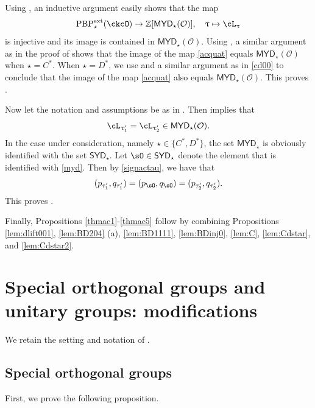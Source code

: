 \documentclass[11pt,a4paper]{amsart}
\def\SYD{{\mathsf{SYD}}}
\def\MYD{{\mathsf{MYD}}}
\newcommand{\CO}{{\mathcal {O}}}
\newcommand{\Z}{\mathbb{Z}}
\newcommand{\be}{\begin {equation}}
\newcommand{\ee}{\end {equation}}
\numberwithin{equation}{section}
\theoremstyle{remark}
\def\PBPes{\mathrm{PBP}^{\mathrm{ext}}_{\star}}
\def\SYD{{\mathsf{SYD}}}
\def\MYD{{\mathsf{MYD}}}
\def\ac{\cL}
\begin{document}
Using , an inductive argument  easily shows that the map
\be\label{acquat}
    \PBPes(\ckcO)\rightarrow \Z[\MYD_\star(\CO)],\quad \uptau\mapsto \ac_\uptau
    \ee
    is injective and its image is contained in  $\MYD_\star(\CO)$.
    Using , a similar argument as in the proof of  shows that the image of the map \eqref{acquat} equals $\MYD_\star(\CO)$ when $\star=C^*$. When $\star=D^*$, we use  and a similar argument as in \eqref{cd00} to conclude that the image of the map \eqref{acquat} also equals $\MYD_\star(\CO)$. This proves . 
    
Now let the notation and assumptions be as in . 
Then  implies that 
\be\label{myd}
\ac_{\uptau_1'}=\ac_{\uptau_2'}\in \MYD_\star(\CO).
\ee
In the case under consideration, namely $\star\in \{C^*, D^*\}$, the set $\MYD_\star$ is obviously identified with the set $\SYD_\star$. Let $\sO\in \SYD_\star$ denote the element that is identified with \eqref{myd}. Then by \eqref{signactau}, we have that
\[
( p_{\tau'_1}, q_{\tau'_1})=(p_\sO, q_\sO)=( p_{\tau'_2}, q_{\tau'_2}).
\]
 This proves .
 
 
 Finally, Propositions \ref{thmac1}-\ref{thmac5} follow by combining Propositions \ref{lem:dlift001}, \ref{lem:BD204} (a), \ref{lem:BD1111}, \ref{lem:BDinj0}, \ref{lem:C},  \ref{lem:Cdstar}, and \ref{lem:Cdstar2}.


\section{Special orthogonal groups and unitary  groups: modifications}\label{modify}

We retain the setting and notation of .  

\subsection{Special orthogonal groups}\label{sorth}

First, we prove the following proposition. 
\end{document}
